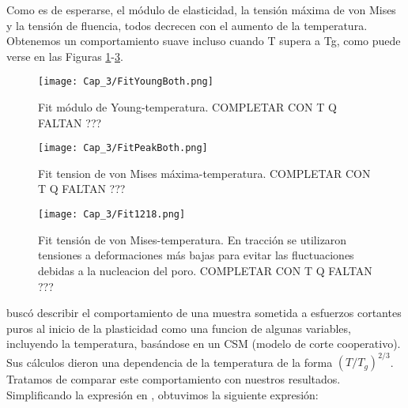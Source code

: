 Como es de esperarse, el módulo de elasticidad, la tensión máxima de von Mises y la tensión de fluencia, todos decrecen con el aumento de la temperatura. Obtenemos un comportamiento suave incluso cuando T supera a Tg, como puede verse en las Figuras \ref{C3:fg:youngVsT}-\ref{C3:fg:peakVMises1218VsT}.


\begin{figure}[htp]
\centering
\texttt{[image: Cap\_3/FitYoungBoth.png]}
\caption[Fit módulo de Young-temperatura.]{Fit módulo de Young-temperatura. COMPLETAR CON T Q FALTAN ???}
\label{C3:fg:youngVsT}
\end{figure}

\begin{figure}[htp]
\centering
\texttt{[image: Cap\_3/FitPeakBoth.png]}
\caption[Fit tension de von Mises máxima-temperatura.]{Fit tension de von Mises máxima-temperatura. COMPLETAR CON T Q FALTAN ???}
\label{C3:fg:peakVMisesVsT}
\end{figure}

\begin{figure}[htp]
\centering
\texttt{[image: Cap\_3/Fit1218.png]}
\caption[Fit tensión de von Mises-temperatura.]{Fit tensión de von Mises-temperatura. En tracción se utilizaron tensiones a deformaciones más bajas para evitar las fluctuaciones debidas a la nucleacion del poro. COMPLETAR CON T Q FALTAN ???}
\label{C3:fg:peakVMises1218VsT}
\end{figure} 

\cite{cheng11} buscó describir el comportamiento de una muestra sometida a esfuerzos cortantes puros al inicio de la plasticidad  como una funcion de algunas variables, incluyendo la temperatura, basándose en un CSM (modelo de corte cooperativo). Sus cálculos dieron una dependencia de la temperatura de la forma $(T/T_g)^{2/3}$. Tratamos de comparar este comportamiento con nuestros resultados. Simplificando la expresión en \cite{cheng11}, obtuvimos la siguiente expresión:


